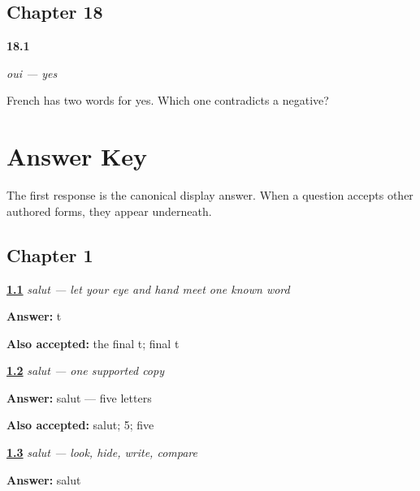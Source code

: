 \section*{Chapter 18}

\noindent\begin{minipage}[t]{\linewidth}
\raggedright
\hypertarget{review-FR-C18-oui-negative}{\textbf{18.1}} \emph{oui — yes}\par
\small French has two words for yes. Which one contradicts a negative?
\end{minipage}\par\medskip

\chapter*{Answer Key}

The first response is the canonical display answer. When a question accepts other authored forms, they appear underneath.

\section*{Chapter 1}

\noindent\begin{minipage}[t]{\linewidth}
\raggedright
\hyperlink{review-FR-W01-salut-observe-final}{\textbf{1.1}} \emph{\emph{salut} — let your eye and hand meet one known word}\par
\small \textbf{Answer:} t\par
\footnotesize \textbf{Also accepted:} the final t; final t
\end{minipage}\par\medskip

\noindent\begin{minipage}[t]{\linewidth}
\raggedright
\hyperlink{review-FR-W01-salut-guided-copy-check}{\textbf{1.2}} \emph{\emph{salut} — one supported copy}\par
\small \textbf{Answer:} salut — five letters\par
\footnotesize \textbf{Also accepted:} salut; 5; five
\end{minipage}\par\medskip

\noindent\begin{minipage}[t]{\linewidth}
\raggedright
\hyperlink{review-FR-W01-salut-delayed-copy-check}{\textbf{1.3}} \emph{\emph{salut} — look, hide, write, compare}\par
\small \textbf{Answer:} salut\par
\end{minipage}\par\medskip


